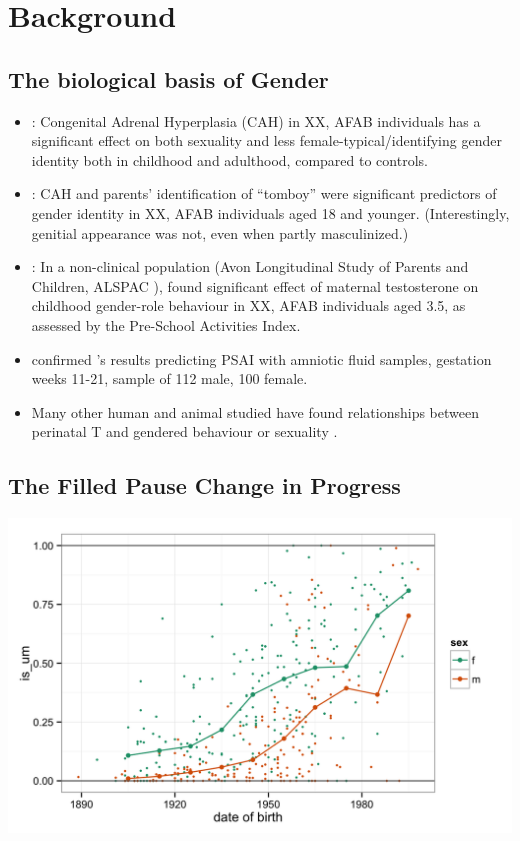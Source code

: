 \documentclass[a0,portrait]{a0poster}
\begin{document}
\begin{multicols}{2}
\begin{enumerate}
\end{enumerate}
\section*{Background}
\subsection{The biological basis of Gender}

\begin{itemize}
	\item \citet{hinesetal2004}: Congenital Adrenal Hyperplasia (CAH) in XX, AFAB individuals has a significant effect on both sexuality and less female-typical/identifying gender identity both in childhood and adulthood, compared to controls.
	\item \citet{berenbaumbailey2003}: CAH and parents' identification of ``tomboy'' were significant predictors of gender identity in XX, AFAB individuals aged 18 and younger. (Interestingly, genitial appearance was not, even when partly masculinized.)
	\item \citet{hinesetal2002}: In a non-clinical population (Avon Longitudinal Study of Parents and Children, ALSPAC \citealt{alspac2001}), found significant effect of maternal testosterone on childhood gender-role behaviour in XX, AFAB individuals aged 3.5, as assessed by the Pre-School Activities Index.
	\item \citet{auyeungetal2009} confirmed \citet{hinesetal2002}'s results predicting PSAI with amniotic fluid samples, gestation weeks 11-21, sample of 112 male, 100 female.
	\item Many other human and animal studied have found relationships between perinatal T and gendered behaviour or sexuality \citep[see][for reviews]{hines2006, balthazart2011}.
\end{itemize}

\subsection{The Filled Pause Change in Progress}

\begin{center}\vspace{1cm}
\includegraphics[width=0.8\linewidth]{um.png}
\end{center}\vspace{1cm}


\end{multicols}
\end{document}
